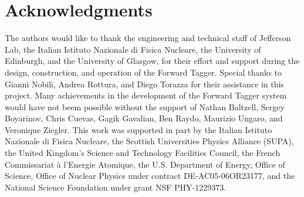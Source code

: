 \section*{Acknowledgments}

The authors would like to thank the engineering and technical staff of Jefferson Lab, the Italian Istituto
Nazionale di Fisica Nucleare, the University of Edinburgh, and the University of Glasgow, for their effort
and support during the design, construction, and operation of the Forward Tagger. Special thanks to Gianni Nobili,
Andrea Rottura, and Diego Torazza for their assistance in this project. Many achievements in the development of
the Forward Tagger system would have not beem possible without the support of Nathan Baltzell, Sergey Boyarinov,
Chris Cuevas, Gagik Gavalian, Ben Raydo, Maurizio Ungaro, and Veronique Ziegler. This work was supported in part
by the Italian Istituto Nazionale di Fisica Nucleare, the Scottish Universities Physics Alliance (SUPA), the United
Kingdom's Science and Technology Facilities Council, the French Commissariat \`{a} l'Energie Atomique, the U.S.
Department of Energy, Office of Science, Office of Nuclear Physics under contract DE-AC05-06OR23177, and the
National Science Foundation under grant NSF PHY-1229373.
